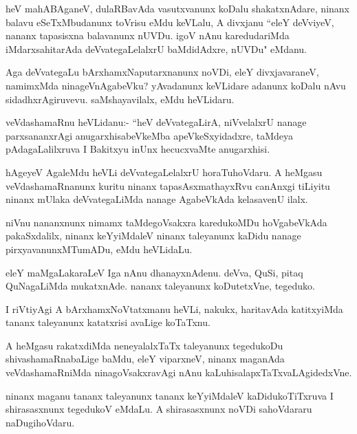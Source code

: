 \documentclass{article}
\begin{document}
\begin{mn}
heV mahABAganeV, dulaRBavAda vasutxvanunx koDalu shakatxnAdare,
ninanx balavu eSeTxMbudanunx toVrisu eMdu keVLalu,
 A divxjanu ``eleY deVviyeV, nananx tapasisxna balavanunx nUVDu. 
igoV nAnu karedudariMda iMdarxsahitarAda deVvategaLelalxrU
baMdidAdxre, nUVDu" eMdanu.
\end{mn} 

\begin{mn}
Aga deVvategaLu bArxhamxNaputarxnanunx noVDi, eleY divxjavaraneV, 
namimxMda ninageVnAgabeVku? yAvadanunx keVLidare adanunx koDalu 
nAvu sidadhxrAgiruvevu. saMshayavilalx, eMdu heVLidaru.
\end{mn} 

\begin{mn}
veVdashamaRnu heVLidanu:- ``heV deVvategaLirA, niVvelalxrU nanage 
parxsananxrAgi anugarxhisabeVkeMba apeVkeSxyidadxre, taMdeya 
pAdagaLalilxruva I Bakitxyu inUnx hecucxvaMte anugarxhisi.
\end{mn} 

\begin{mn}
hAgeyeV AgaleMdu heVLi deVvategaLelalxrU horaTuhoVdaru.
 A heMgasu veVdashamaRnanunx kuritu ninanx 
tapasAsxmathayxRvu canAnxgi tiLiyitu ninanx mUlaka deVvategaLiMda  
nanage AgabeVkAda kelasavenU ilalx.
\end{mn} 

\begin{mn}
niVnu nananxnunx nimamx taMdegoVsakxra karedukoMDu hoVgabeVkAda
pakaSxdalilx, ninanx keYyiMdaleV ninanx taleyanunx kaDidu 
nanage pirxyavanunxMTumADu, eMdu heVLidaLu.
\end{mn} 
 
\begin{mn}
eleY maMgaLakaraLeV Iga nAnu dhanayxnAdenu. deVva, QuSi,
pitaq QuNagaLiMda mukatxnAde. nananx taleyanunx 
koDutetxVne, tegeduko.
\end{mn} 

\begin{mn}
I riVtiyAgi A bArxhamxNoVtatxmanu heVLi, nakukx, haritavAda 
katitxyiMda tananx taleyanunx katatxrisi avaLige koTaTxnu.
\end{mn} 

\begin{mn}
A heMgasu rakatxdiMda neneyalalxTaTx taleyanunx tegedukoDu 
shivashamaRnabaLige baMdu, eleY viparxneV, ninanx maganAda 
veVdashamaRniMda ninagoVsakxravAgi nAnu
kaLuhisalapxTaTxvaLAgidedxVne.
\end{mn} 

\begin{mn}
ninanx maganu tananx taleyanunx tananx keYyiMdaleV 
kaDidukoTiTxruva I shirasasxnunx tegedukoV eMdaLu. A shirasasxnunx
noVDi sahoVdararu naDugihoVdaru.
\end{mn} 
\end{document}
